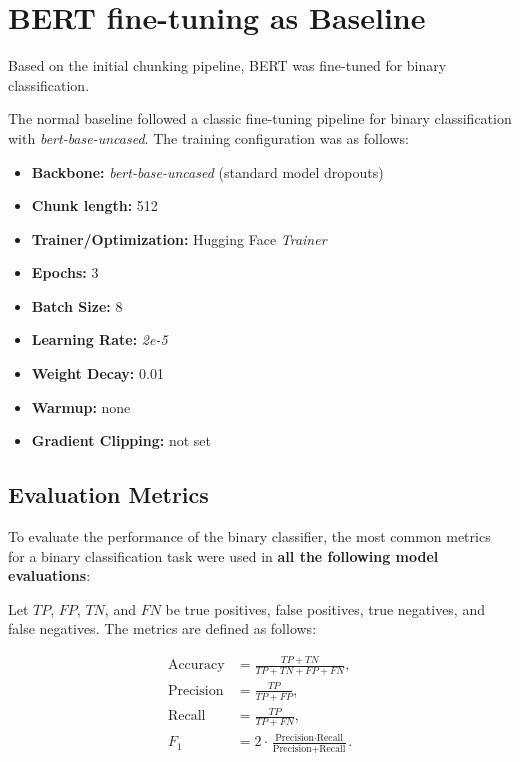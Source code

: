 
\section{BERT fine-tuning as Baseline}

Based on the initial chunking pipeline, BERT was fine-tuned for binary classification. 

The normal baseline followed a classic fine-tuning pipeline for binary classification with \textit{bert-base-uncased}. The training configuration was as follows:

\begin{itemize}
  \item \textbf{Backbone:} \textit{bert-base-uncased} (standard model dropouts)
  \item \textbf{Chunk length:} 512
  \item \textbf{Trainer/Optimization:} Hugging Face \textit{Trainer}
  \item \textbf{Epochs:} 3
  \item \textbf{Batch Size:} 8 
  \item \textbf{Learning Rate:} \textit{2e-5}
  \item \textbf{Weight Decay:} 0.01
  \item \textbf{Warmup:} none
  \item \textbf{Gradient Clipping:} not set
\end{itemize}



\subsection{Evaluation Metrics}
To evaluate the performance of the binary classifier, the most common metrics for a binary classification task were used in \textbf{all the following model evaluations}:

Let $TP$, $FP$, $TN$, and $FN$ be true positives, false positives, true negatives, and false negatives. 
The metrics are defined as follows:

\begin{align}
\text{Accuracy} &= \frac{TP + TN}{TP + TN + FP + FN}, \\
\text{Precision} &= \frac{TP}{TP + FP}, \\
\text{Recall} &= \frac{TP}{TP + FN}, \\
F_{1} &= 2 \cdot \frac{\text{Precision} \cdot \text{Recall}}{\text{Precision} + \text{Recall}}.
\end{align}

